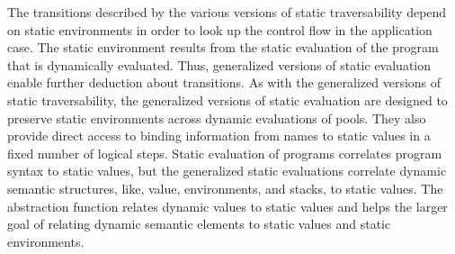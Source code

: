 \documentclass{article}
\begin{document}
The transitions described by the various versions of static traversability depend on static
environments in order to look up the control flow in the application case.
The static environment
results from the static evaluation of the program that is dynamically evaluated. Thus,
generalized
versions of static evaluation enable further deduction about transitions.
As with the generalized versions of static traversability,
the generalized versions of static evaluation are designed to
preserve static environments across
dynamic evaluations of pools. They also provide direct access to binding information from names
to static values in a fixed number of logical steps. Static evaluation of programs correlates
program syntax to static values, but the generalized static evaluations correlate dynamic
semantic structures, like, value, environments, and stacks, to static values. The abstraction
function relates dynamic values to static values and helps the larger goal of relating dynamic
semantic elements to static values and static environments.    
\end{document}
